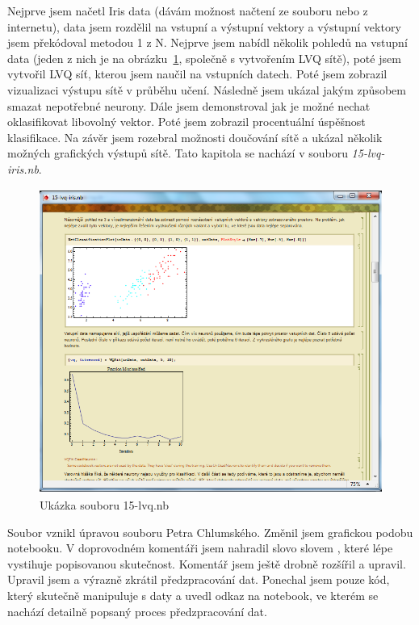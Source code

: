 \documentclass[11pt,twoside,a4paper]{book}
\begin{document}
Nejprve jsem načetl Iris data (dávám možnost načtení ze souboru nebo z internetu), data jsem rozdělil na vstupní a výstupní vektory a výstupní vektory jsem překódoval metodou 1 z N. Nejprve jsem nabídl několik pohledů na vstupní data (jeden z nich je na obrázku~\ref{fig:lvq}, společně s vytvořením LVQ sítě), poté jsem vytvořil LVQ síť, kterou jsem naučil na vstupních datech. Poté jsem zobrazil vizualizaci výstupu sítě v průběhu učení. Následně jsem ukázal jakým způsobem smazat nepotřebné neurony. Dále jsem demonstroval jak je možné nechat oklasifikovat libovolný vektor. Poté jsem zobrazil procentuální úspěšnost klasifikace. Na závěr jsem rozebral možnosti doučování sítě a ukázal několik možných grafických výstupů sítě. Tato kapitola se nachází v souboru \textit{15-lvq-iris.nb}.

\begin{figure}[h!]
\begin{center}
\includegraphics[height=10cm]{figures/ukazka15.png}
\caption{Ukázka souboru 15-lvq.nb}
\label{fig:lvq}
\end{center}
\end{figure}

Soubor vznikl úpravou souboru Petra Chlumského. Změnil jsem grafickou podobu notebooku. V doprovodném komentáři jsem nahradil slovo  slovem , které lépe vystihuje popisovanou skutečnost. Komentář jsem ještě drobně rozšířil a upravil. Upravil jsem a výrazně zkrátil předzpracování dat. Ponechal jsem pouze kód, který skutečně manipuluje s daty a uvedl odkaz na notebook, ve kterém se nachází detailně popsaný proces předzpracování dat. 
\end{document}
